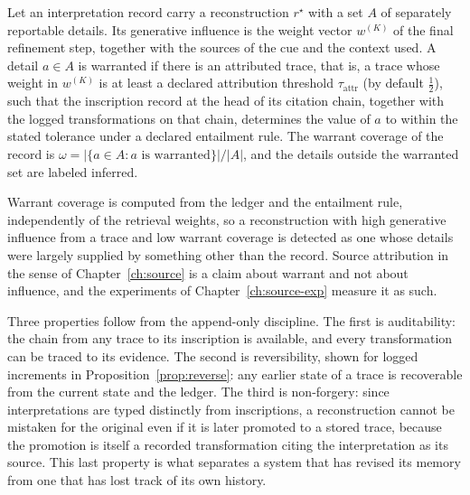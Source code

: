 \begin{definition}\label{def:warrant}
Let an interpretation record carry a reconstruction $r^\star$ with a set $A$ of separately reportable details. Its generative influence is the weight vector $w^{(K)}$ of the final refinement step, together with the sources of the cue and the context used. A detail $a\in A$ is warranted if there is an attributed trace, that is, a trace whose weight in $w^{(K)}$ is at least a declared attribution threshold $\tau_{\mathrm{attr}}$ (by default $\tfrac12$), such that the inscription record at the head of its citation chain, together with the logged transformations on that chain, determines the value of $a$ to within the stated tolerance under a declared entailment rule. The warrant coverage of the record is $\omega=|\{a\in A:a\text{ is warranted}\}|/|A|$, and the details outside the warranted set are labeled inferred.
\end{definition}

Warrant coverage is computed from the ledger and the entailment rule, independently of the retrieval weights, so a reconstruction with high generative influence from a trace and low warrant coverage is detected as one whose details were largely supplied by something other than the record. Source attribution in the sense of Chapter~\ref{ch:source} is a claim about warrant and not about influence, and the experiments of Chapter~\ref{ch:source-exp} measure it as such.

Three properties follow from the append-only discipline. The first is auditability: the chain from any trace to its inscription is available, and every transformation can be traced to its evidence. The second is reversibility, shown for logged increments in Proposition~\ref{prop:reverse}: any earlier state of a trace is recoverable from the current state and the ledger. The third is non-forgery: since interpretations are typed distinctly from inscriptions, a reconstruction cannot be mistaken for the original even if it is later promoted to a stored trace, because the promotion is itself a recorded transformation citing the interpretation as its source. This last property is what separates a system that has revised its memory from one that has lost track of its own history.


